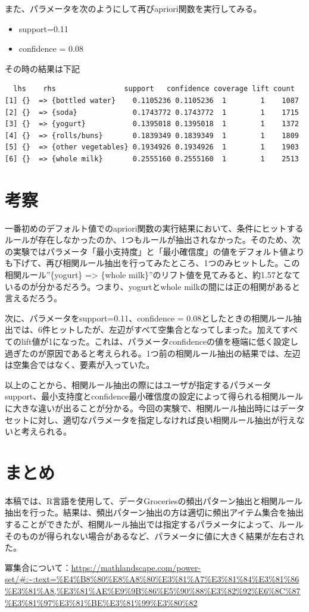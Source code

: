 \documentclass[dvipdfmx]{jsarticle}
\begin{document}
また、パラメータを次のようにして再びapriori関数を実行してみる。
\begin{itemize}
  \item support=0.11
  \item confidence = 0.08
\end{itemize}
その時の結果は下記
\begin{verbatim}
  lhs    rhs                support   confidence coverage lift count
[1] {}  => {bottled water}    0.1105236 0.1105236  1        1    1087
[2] {}  => {soda}             0.1743772 0.1743772  1        1    1715
[3] {}  => {yogurt}           0.1395018 0.1395018  1        1    1372
[4] {}  => {rolls/buns}       0.1839349 0.1839349  1        1    1809
[5] {}  => {other vegetables} 0.1934926 0.1934926  1        1    1903
[6] {}  => {whole milk}       0.2555160 0.2555160  1        1    2513
\end{verbatim}

\section{考察}
一番初めのデフォルト値でのapriori関数の実行結果において、条件にヒットするルールが存在しなかったのか、1つもルールが抽出されなかった。そのため、次の実験ではパラメータ「最小支持度」と「最小確信度」の値をデフォルト値よりも下げて、再び相関ルール抽出を行ってみたところ、1つのみヒットした。この相関ルール”\{yogurt\} => \{whole milk\}”のリフト値を見てみると、約1.57となているのが分かるだろう。つまり、yogurtとwhole milkの間には正の相関があると言えるだろう。\par
次に、パラメータをsupport=0.11、confidence = 0.08としたときの相関ルール抽出では、6件ヒットしたが、左辺がすべて空集合となってしまった。加えてすべてのlift値が1になった。これは、パラメータconfidenceの値を極端に低く設定し過ぎたのが原因であると考えられる。1つ前の相関ルール抽出の結果では、左辺は空集合ではなく、要素が入っていた。\par
以上のことから、相関ルール抽出の際にはユーザが指定するパラメータsupport、最小支持度とconfidence最小確信度の設定によって得られる相関ルールに大きな違いが出ることが分かる。今回の実験で、相関ルール抽出時にはデータセットに対し、適切なパラメータを指定しなければ良い相関ルール抽出が行えないと考えられる。
\section{まとめ}
本稿では、R言語を使用して、データGroceriesの頻出パターン抽出と相関ルール抽出を行った。結果は、頻出パターン抽出の方は適切に頻出アイテム集合を抽出することができたが、相関ルール抽出では指定するパラメータによって、ルールそのものが得られない場合があるなど、パラメータに値に大きく結果が左右された。
\begin{thebibliography}{99}
  \bibitem 冪集合について：\url{https://mathlandscape.com/power-set/#:~:text=%E4%B8%80%E8%A8%80%E3%81%A7%E3%81%84%E3%81%86%E3%81%A8,%E3%81%AE%E9%9B%86%E5%90%88%E3%82%92%E6%8C%87%E3%81%97%E3%81%BE%E3%81%99%E3%80%82}
\end{thebibliography}
\end{document}
